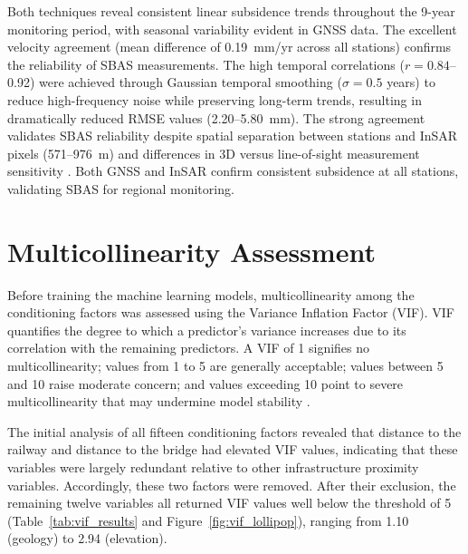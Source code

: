 \documentclass[oneside,doublespacing,flushright]{lsuthesis}
\begin{document}
Both techniques reveal consistent linear subsidence trends throughout the 9-year monitoring period, with seasonal variability evident in GNSS data. The excellent velocity agreement 
(mean difference of 0.19~mm/yr across all stations) confirms the reliability of SBAS measurements. The high temporal correlations ($r = 0.84$--0.92) were achieved through Gaussian temporal smoothing ($\sigma = 0.5$ years) to reduce high-frequency noise while preserving long-term trends, resulting in dramatically reduced RMSE values (2.20--5.80~mm). The strong agreement validates SBAS reliability despite spatial separation between 
stations and InSAR pixels (571--976~m) and differences in 3D versus line-of-sight measurement sensitivity \citep{Crosetto2016}. Both GNSS and InSAR confirm 
consistent subsidence at all stations, validating SBAS for regional monitoring.


\section{Multicollinearity Assessment}

Before training the machine learning models, multicollinearity among the conditioning factors was assessed using the Variance Inflation Factor (VIF). 
VIF quantifies the degree to which a predictor's variance increases due to its correlation with the remaining predictors. A VIF of 1 signifies no multicollinearity; values 
from 1 to 5 are generally acceptable; values between 5 and 10 raise moderate concern; and values exceeding 10 point to severe multicollinearity that may 
undermine model stability \citep{Dormann2013}.

The initial analysis of all fifteen conditioning factors revealed that distance to the railway and distance to the bridge had elevated VIF values, indicating that these 
variables were largely redundant relative to other infrastructure proximity variables. Accordingly, these two factors were removed. After their exclusion, 
the remaining twelve variables all returned VIF values well below the threshold of 5 (Table~\ref{tab:vif_results} and Figure~\ref{fig:vif_lollipop}), 
ranging from 1.10 (geology) to 2.94 (elevation).
\end{document}
